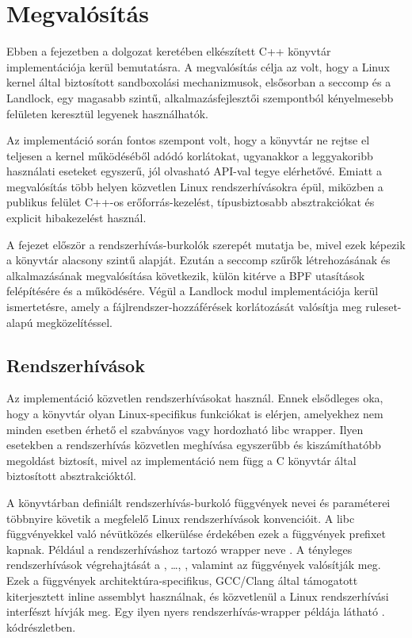 \chapter{Megvalósítás}

Ebben a fejezetben a dolgozat keretében elkészített C++ könyvtár
implementációja kerül bemutatásra. A megvalósítás célja az volt, hogy a Linux
kernel által biztosított sandboxolási mechanizmusok, elsősorban a seccomp és a
Landlock, egy magasabb szintű, alkalmazásfejlesztői szempontból kényelmesebb
felületen keresztül legyenek használhatók.

Az implementáció során fontos szempont volt, hogy a könyvtár ne rejtse el
teljesen a kernel működéséből adódó korlátokat, ugyanakkor a leggyakoribb
használati eseteket egyszerű, jól olvasható API-val tegye elérhetővé. Emiatt a
megvalósítás több helyen közvetlen Linux rendszerhívásokra épül, miközben a
publikus felület C++-os erőforrás-kezelést, típusbiztosabb absztrakciókat és
explicit hibakezelést használ.

A fejezet először a rendszerhívás-burkolók szerepét mutatja be, mivel ezek
képezik a könyvtár alacsony szintű alapját. Ezután a seccomp szűrők
létrehozásának és alkalmazásának megvalósítása következik, külön kitérve a BPF
utasítások felépítésére és a  működésére. Végül a Landlock
modul implementációja kerül ismertetésre, amely a fájlrendszer-hozzáférések
korlátozását valósítja meg ruleset-alapú megközelítéssel.

\section{Rendszerhívások}

Az implementáció közvetlen rendszerhívásokat használ. Ennek elsődleges oka,
hogy a könyvtár olyan Linux-specifikus funkciókat is elérjen, amelyekhez nem
minden esetben érhető el szabványos vagy hordozható libc wrapper. Ilyen
esetekben a rendszerhívás közvetlen meghívása egyszerűbb és kiszámíthatóbb
megoldást biztosít, mivel az implementáció nem függ a C könyvtár által
biztosított absztrakcióktól.

A könyvtárban definiált rendszerhívás-burkoló függvények nevei és paraméterei
többnyire követik a megfelelő Linux rendszerhívások konvencióit. A libc
függvényekkel való névütközés elkerülése érdekében ezek a függvények
 prefixet kapnak. Például a  rendszerhíváshoz
tartozó wrapper neve .
A tényleges rendszerhívások végrehajtását a ,
\ldots, , valamint az 
függvények valósítják meg. Ezek a függvények architektúra-specifikus, GCC/Clang
által támogatott kiterjesztett inline assemblyt használnak, és közvetlenül a
Linux rendszerhívási interfészt hívják meg. Egy ilyen nyers rendszerhívás-wrapper
példája látható . kódrészletben.

